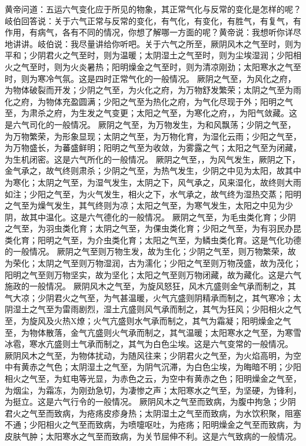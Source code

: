 \documentclass[12pt,UTF8]{ctexbook}
\begin{document}
黄帝问道：五运六气变化应于所见的物象，其正常气化与反常的变化是怎样的呢？岐伯回答说：关于六气正常与反常的变化，有气化，有变化，有胜气，有复气，有作用，有病气，各有不同的情况，你想了解哪一方面的呢？黄帝说：我想听你详尽地讲讲。岐伯说：我尽量讲给你听吧。关于六气之所至，厥阴风木之气至时，则为平和；少阴君火之气至时，则为温暖；太阴湿土之气至时，则为尘埃湿润；少阳相火之气至时，则为火炎暑热；阳明燥金之气至时，则为清凉刚劲；太阳寒水之气至时，则为寒冷气氛。这是四时正常气化的一般情况。
厥阴之气至，为风化之府，为物体破裂而开发；少阴之气至，为火化之府，为万物舒发繁荣；太阴之气至为雨化之府，为物体充盈圆满；少阳之气至为热化之府，为气化尽现于外；阳明之气至，为肃杀之府，为生发之气变更；太阳之气至，为寒化之府，，为阳气敛藏。这是六气司化的一般情况。
厥阴之气至，为万物发生，为和风飘荡；少阴之气至，为万物繁荣，为形象显现；太阴之气至，为万物化育，为湿化云雨；少阳之气至，为万物盛长，为蕃盛鲜明；阳明之气至为收敛，为雾露之气；太阳之气至为闭藏，为生机闭密。这是六气所化的一般情况。
厥阴之气至，，为风气发生，厥阴之下，金气承之，故气终则肃杀；少阴之气至，为热气发生，少阴之中见为太阳，故其中为寒化；太阴之气至，为湿气发生，太阴之下，风气承之，风来湿化，故终则大雨如注；少阳之气至，为火气发生，相火之下，水气承之，故气终为湿热交蒸；阳明之气至为燥气发生，其气终则为凉；太阳之气至，为寒气发生，太阳之中见为少阴，故其中温化。这是六气德化的一般情况。
厥阴之气至，为毛虫类化育；少阴之气至，为羽虫类化育；太阴之气至，为倮虫类化育；少阳之气至，为有羽民办昆类化育；阳明之气至，为介虫类化育；太阳之气至，为鳞虫类化育。这是气化功德的一般情况。
厥阴之气至则万物生发，故为生化；少阴之气至，则万物繁荣，故为荣化；太阴之气至则万物湿润，古为濡化；少阳之气至则万物茂盛，故为茂化；阳明之气至则万物坚实，故为坚化；太阳之气至则万物闭藏，故为藏化。这是六气施政的一般情况。
厥阴风木之气至，为旋风怒狂，风木亢盛则金气承而制之，其气大凉；少阴君火之气至，为气甚温暖，火气亢盛则阴精承而制之，其气寒冷；太阴湿土之气至为雷雨剧烈，湿土亢盛则风气承而制之，其气为狂风；少阳相火之气至，为旋风及火热X燎；火气亢盛则水气承而制之，其气为霜凝；阳明燥金之气至，为物体散落，金气亢盛则火气承而制之，其气温暖；太阳寒水之气至，为寒雪冰雹，寒水亢盛则土气承而制之，其气为白色尘埃。这是六气变常的一般情况。
厥阴风木之气至，为物体扰动，为随风往来；少阴君火之气至，为火焰高明，为空中有黄赤之气色；太阴湿土之气至，为阴气沉滞，为白色尘埃，为晦暗不明；少阳相火之气至，为虹电等光显，为赤色之云，为空中有黄赤之色；阳明燥金之气至，为烟尘，为霜冻，为刚劲急切，为凄惨之声；太阳寒水之气至，为坚硬，为锋利，为挺立。这是六气行令的一般情况。
厥阴风木之气至而致病，为腹中拘急；少阴君火之气至而致病，为疮疡皮疹身热；太阴湿土之气至而致病，为水饮积聚，阻塞不通；少阳相火之气至而致病，为喷嚏呕吐，为疮疡；阳明燥金之气至而致病，为皮肤气肿；太阳寒水之气至而致病，为关节屈伸不利。这是六气致病的一般情况。
\end{document}
